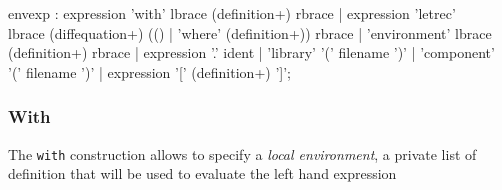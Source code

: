 
\begin{rail}
envexp :    expression 'with' lbrace (definition+) rbrace
          | expression 'letrec' \\ lbrace (diffequation+) (() | 'where' (definition+)) rbrace
          | 'environment' lbrace (definition+) rbrace
		  | expression '.' ident
          | 'library' '(' filename ')'
          | 'component' '(' filename ')'
          | expression '[' (definition+) ']';         
\end{rail}

\subsubsection{With} 
The \lstinline'with' construction allows to specify a \textit{local environment}, a private list of definition that will be used to evaluate the left hand expression


